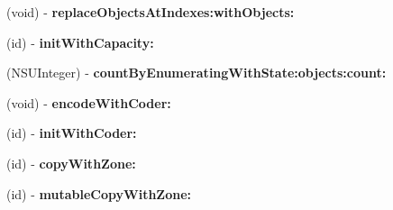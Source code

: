 \begin{DoxyCompactItemize}
\item 
\hypertarget{interfaceget_open_orders_by_g_l_n_response_a117aa4194fe842252e1fb01234185ef7}{}(void) -\/ {\bfseries replace\+Objects\+At\+Indexes\+:with\+Objects\+:}\label{interfaceget_open_orders_by_g_l_n_response_a117aa4194fe842252e1fb01234185ef7}

\item 
\hypertarget{interfaceget_open_orders_by_g_l_n_response_a549d021ab2806ef4a554a6d83fdc7f0a}{}(id) -\/ {\bfseries init\+With\+Capacity\+:}\label{interfaceget_open_orders_by_g_l_n_response_a549d021ab2806ef4a554a6d83fdc7f0a}

\item 
\hypertarget{interfaceget_open_orders_by_g_l_n_response_a1f36bb5533e7f64e7f963991b0cc1c6d}{}(N\+S\+U\+Integer) -\/ {\bfseries count\+By\+Enumerating\+With\+State\+:objects\+:count\+:}\label{interfaceget_open_orders_by_g_l_n_response_a1f36bb5533e7f64e7f963991b0cc1c6d}

\item 
\hypertarget{interfaceget_open_orders_by_g_l_n_response_a491bf04f39021c6f54079353a76787cb}{}(void) -\/ {\bfseries encode\+With\+Coder\+:}\label{interfaceget_open_orders_by_g_l_n_response_a491bf04f39021c6f54079353a76787cb}

\item 
\hypertarget{interfaceget_open_orders_by_g_l_n_response_ad2b884131348fcf46ff9415dee6f5aa1}{}(id) -\/ {\bfseries init\+With\+Coder\+:}\label{interfaceget_open_orders_by_g_l_n_response_ad2b884131348fcf46ff9415dee6f5aa1}

\item 
\hypertarget{interfaceget_open_orders_by_g_l_n_response_a965908ff453e3f521422070bfbfb50e4}{}(id) -\/ {\bfseries copy\+With\+Zone\+:}\label{interfaceget_open_orders_by_g_l_n_response_a965908ff453e3f521422070bfbfb50e4}

\item 
\hypertarget{interfaceget_open_orders_by_g_l_n_response_a21a1b283edb3ecd615cd6c791872d6ca}{}(id) -\/ {\bfseries mutable\+Copy\+With\+Zone\+:}\label{interfaceget_open_orders_by_g_l_n_response_a21a1b283edb3ecd615cd6c791872d6ca}

\end{DoxyCompactItemize}
